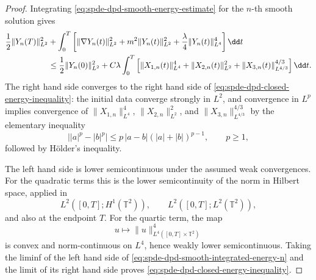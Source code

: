\begin{proof}
Integrating
\eqref{eq:spde-dpd-smooth-energy-estimate} for the \(n\)-th smooth solution
gives
\begin{align}
  \frac12\|Y_n(T)\|_{L^2}^2
  &+
  \int_0^T
  \left[
    \|\nabla Y_n(t)\|_{L^2}^2
    +m^2\|Y_n(t)\|_{L^2}^2
    +\frac{\lambda}{4}\|Y_n(t)\|_{L^4}^4
  \right]\dd t
  \notag\\
  &\leq
  \frac12\|Y_n(0)\|_{L^2}^2
  +
  C\lambda
  \int_0^T
  \left[
    \|X_{1,n}(t)\|_{L^4}^4
    +\|X_{2,n}(t)\|_{L^2}^2
    +\|X_{3,n}(t)\|_{L^{4/3}}^{4/3}
  \right]\dd t .
  \label{eq:spde-dpd-smooth-integrated-energy-n}
\end{align}
The right hand side converges to the right hand side of
\eqref{eq:spde-dpd-closed-energy-inequality}: the initial data converge
strongly in \(L^2\), and convergence in \(L^p\) implies convergence of
\(\|X_{1,n}\|_{L^4}^4\), \(\|X_{2,n}\|_{L^2}^2\), and
\(\|X_{3,n}\|_{L^{4/3}}^{4/3}\) by the elementary inequality
\[
  \bigl||a|^p-|b|^p\bigr|
  \leq
  p\,|a-b|(|a|+|b|)^{p-1},
  \qquad p\geq1,
\]
followed by Hölder's inequality.

The left hand side is lower semicontinuous under the assumed weak
convergences.  For the quadratic terms this is the lower semicontinuity of
the norm in Hilbert space, applied in
\[
  L^2([0,T];H^1(\mathbb T^2)),
  \qquad
  L^2([0,T];L^2(\mathbb T^2)),
\]
and also at the endpoint \(T\).  For the quartic term,
the map
\[
  u\longmapsto
  \|u\|_{L^4([0,T]\times\mathbb T^2)}^4
\]
is convex and norm-continuous on \(L^4\), hence weakly lower
semicontinuous.  Taking the liminf of the left hand side of
\eqref{eq:spde-dpd-smooth-integrated-energy-n} and the limit of its right
hand side proves \eqref{eq:spde-dpd-closed-energy-inequality}.
\end{proof}

